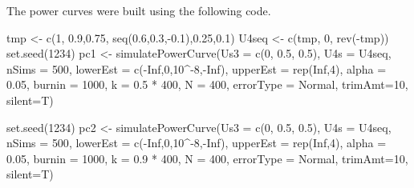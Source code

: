 \documentclass[
]{article}
\newenvironment{Shaded}{\begin{snugshade}}{\end{snugshade}}
\newcommand{\AttributeTok}[1]{\textcolor[rgb]{0.77,0.63,0.00}{#1}}
\newcommand{\ConstantTok}[1]{\textcolor[rgb]{0.00,0.00,0.00}{#1}}
\newcommand{\DecValTok}[1]{\textcolor[rgb]{0.00,0.00,0.81}{#1}}
\newcommand{\FloatTok}[1]{\textcolor[rgb]{0.00,0.00,0.81}{#1}}
\newcommand{\FunctionTok}[1]{\textcolor[rgb]{0.00,0.00,0.00}{#1}}
\newcommand{\NormalTok}[1]{#1}
\newcommand{\OtherTok}[1]{\textcolor[rgb]{0.56,0.35,0.01}{#1}}
\newcommand{\SpecialCharTok}[1]{\textcolor[rgb]{0.00,0.00,0.00}{#1}}
\newcommand{\StringTok}[1]{\textcolor[rgb]{0.31,0.60,0.02}{#1}}
\begin{document}
The power curves were built using the following code.

\begin{Shaded}
\begin{Highlighting}[]
\NormalTok{tmp }\OtherTok{\textless{}{-}} \FunctionTok{c}\NormalTok{(}\DecValTok{1}\NormalTok{, }\FloatTok{0.9}\NormalTok{,}\FloatTok{0.75}\NormalTok{, }\FunctionTok{seq}\NormalTok{(}\FloatTok{0.6}\NormalTok{,}\FloatTok{0.3}\NormalTok{,}\SpecialCharTok{{-}}\FloatTok{0.1}\NormalTok{),}\FloatTok{0.25}\NormalTok{,}\FloatTok{0.1}\NormalTok{)}
\NormalTok{U4seq }\OtherTok{\textless{}{-}} \FunctionTok{c}\NormalTok{(tmp, }\DecValTok{0}\NormalTok{, }\FunctionTok{rev}\NormalTok{(}\SpecialCharTok{{-}}\NormalTok{tmp))}
\FunctionTok{set.seed}\NormalTok{(}\DecValTok{1234}\NormalTok{)}
\NormalTok{pc1 }\OtherTok{\textless{}{-}} \FunctionTok{simulatePowerCurve}\NormalTok{(}\AttributeTok{Us3 =} \FunctionTok{c}\NormalTok{(}\DecValTok{0}\NormalTok{, }\FloatTok{0.5}\NormalTok{, }\FloatTok{0.5}\NormalTok{), }\AttributeTok{U4s =}\NormalTok{ U4seq,}
                     \AttributeTok{nSims =} \DecValTok{500}\NormalTok{, }\AttributeTok{lowerEst =} \FunctionTok{c}\NormalTok{(}\SpecialCharTok{{-}}\ConstantTok{Inf}\NormalTok{,}\DecValTok{0}\NormalTok{,}\DecValTok{10}\SpecialCharTok{\^{}{-}}\DecValTok{8}\NormalTok{,}\SpecialCharTok{{-}}\ConstantTok{Inf}\NormalTok{), }
                     \AttributeTok{upperEst =} \FunctionTok{rep}\NormalTok{(}\ConstantTok{Inf}\NormalTok{,}\DecValTok{4}\NormalTok{), }\AttributeTok{alpha =} \FloatTok{0.05}\NormalTok{,}
                     \AttributeTok{burnin =} \DecValTok{1000}\NormalTok{, }\AttributeTok{k =} \FloatTok{0.5} \SpecialCharTok{*} \DecValTok{400}\NormalTok{, }\AttributeTok{N =} \DecValTok{400}\NormalTok{, }
                     \AttributeTok{errorType =} \StringTok{\textquotesingle{}Normal\textquotesingle{}}\NormalTok{, }\AttributeTok{trimAmt=}\DecValTok{10}\NormalTok{,}
                     \AttributeTok{silent=}\NormalTok{T)}

\FunctionTok{set.seed}\NormalTok{(}\DecValTok{1234}\NormalTok{)}
\NormalTok{pc2 }\OtherTok{\textless{}{-}} \FunctionTok{simulatePowerCurve}\NormalTok{(}\AttributeTok{Us3 =} \FunctionTok{c}\NormalTok{(}\DecValTok{0}\NormalTok{, }\FloatTok{0.5}\NormalTok{, }\FloatTok{0.5}\NormalTok{), }\AttributeTok{U4s =}\NormalTok{ U4seq,}
                     \AttributeTok{nSims =} \DecValTok{500}\NormalTok{, }\AttributeTok{lowerEst =} \FunctionTok{c}\NormalTok{(}\SpecialCharTok{{-}}\ConstantTok{Inf}\NormalTok{,}\DecValTok{0}\NormalTok{,}\DecValTok{10}\SpecialCharTok{\^{}{-}}\DecValTok{8}\NormalTok{,}\SpecialCharTok{{-}}\ConstantTok{Inf}\NormalTok{), }
                     \AttributeTok{upperEst =} \FunctionTok{rep}\NormalTok{(}\ConstantTok{Inf}\NormalTok{,}\DecValTok{4}\NormalTok{), }\AttributeTok{alpha =} \FloatTok{0.05}\NormalTok{,}
                     \AttributeTok{burnin =} \DecValTok{1000}\NormalTok{, }\AttributeTok{k =} \FloatTok{0.9} \SpecialCharTok{*} \DecValTok{400}\NormalTok{, }\AttributeTok{N =} \DecValTok{400}\NormalTok{, }
                     \AttributeTok{errorType =} \StringTok{\textquotesingle{}Normal\textquotesingle{}}\NormalTok{, }\AttributeTok{trimAmt=}\DecValTok{10}\NormalTok{,}
                     \AttributeTok{silent=}\NormalTok{T)}


\end{Highlighting}
\end{Shaded}
\end{document}
